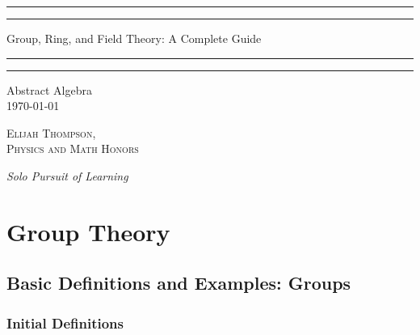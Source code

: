 \documentclass[12pt, a4paper, twoside, openright, titlepage]{book}
\begin{document}

\begin{titlepage}
    \centering
    \scshape
    \vspace*{\baselineskip}
    \rule{\textwidth}{1.6pt}\vspace*{-\baselineskip}\vspace*{2pt}
    \rule{\textwidth}{0.4pt}
    
    \vspace{0.75\baselineskip}
    
    {\LARGE Group, Ring, and Field Theory: A Complete Guide}
    
    \vspace{0.75\baselineskip}
    
    \rule{\textwidth}{0.4pt}\vspace*{-\baselineskip}\vspace{3.2pt}
    \rule{\textwidth}{1.6pt}
    
    \vspace{2\baselineskip}
    Abstract Algebra \\
    \vspace*{3\baselineskip}
    \monthdayyeardate\today \\
    \vspace*{5.0\baselineskip}
    
    {\scshape\Large Elijah Thompson, \\ Physics and Math Honors\\}
    
    \vspace{1.0\baselineskip}
    \textit{Solo Pursuit of Learning}
\end{titlepage}

\tableofcontents

\part{Group Theory}

\chapter{\textsection\textsection Basic Definitions and Examples: Groups}

\section{\textsection Initial Definitions}
\end{document}
